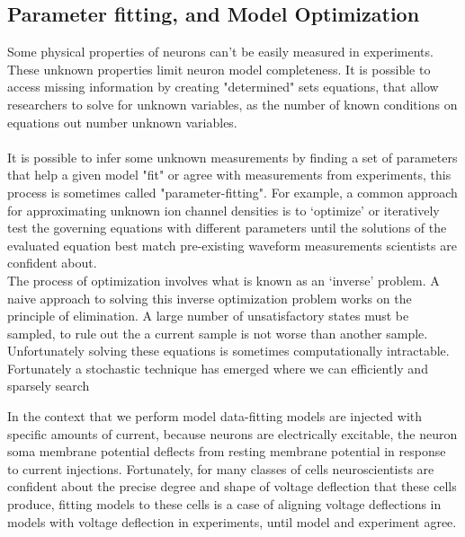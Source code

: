 \subsection{Parameter fitting, and Model Optimization}
%
Some physical properties of neurons can’t be easily measured in experiments. These unknown properties limit neuron model completeness. It is possible to access missing information by creating "determined" sets equations, that allow researchers to solve for unknown variables, as the number of known conditions on equations out number unknown variables.\\
\\
It is possible to infer some unknown measurements by finding a set of parameters that help a given model "fit" or agree with measurements from experiments, this process is sometimes called "parameter-fitting". For example, a common approach for approximating unknown ion channel densities is to ‘optimize’ or iteratively test the governing equations with different parameters until the solutions of the evaluated equation best match pre-existing waveform measurements scientists are confident about. 
\\
The process of optimization involves what is known as an ‘inverse’ problem. A naive approach to solving this inverse optimization problem works on the principle of elimination. A large number of unsatisfactory states must be sampled, to rule out the a current sample is not worse than another sample. Unfortunately solving these equations is sometimes computationally intractable.\\

Fortunately a stochastic technique has emerged where we can efficiently and sparsely search


In the context that we perform model data-fitting models are injected with specific amounts of current, because neurons are electrically excitable, the neuron soma membrane potential deflects from resting membrane potential in response to current injections. Fortunately, for many classes of cells neuroscientists are confident about the precise degree and shape of voltage deflection that these cells produce, fitting models to these cells is a case of aligning voltage deflections in models with voltage deflection in experiments, until model and experiment agree.

